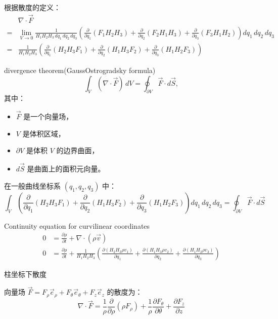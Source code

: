 \documentclass[12pt, a4paper, oneside, UTF8]{ctexbook}  %
\newcommand{\pa}{\partial}
\begin{document}
\begin{defn}
\begin{tui}
根据散度的定义：
\begin{align*}
    &\nabla \cdot \vec{F} 
    \\=& \lim_{V \to 0} \frac{1}{H_1 H_2 H_3 \, dq_1 \, dq_2 \, dq_3} \left( \frac{\partial}{\partial q_1} (F_1 H_2 H_3) 
    + \frac{\partial}{\partial q_2} (F_2 H_1 H_3) + \frac{\partial}{\partial q_3} (F_3 H_1 H_2) \right) dq_1 \, dq_2 \, dq_3
    \\=&\frac{1}{H_1 H_2 H_3} \left( \frac{\partial}{\partial q_1} (H_2 H_3 F_1) + \frac{\partial}{\partial q_2} (H_1 H_3 F_2) 
    + \frac{\partial}{\partial q_3} (H_1 H_2 F_3) \right)
\end{align*}
\end{tui}    
\end{defn}
\begin{lemma}
    divergence theorem(Gauss\textminus Ostrogradsky formula)
\[
\int_V (\nabla \cdot \vec{F}) \, dV = \oint_{\partial V} \vec{F} \cdot d\vec{S},
\]
其中：
\begin{itemize}
    \item \(\vec{F}\) 是一个向量场，
    \item \(V\) 是体积区域，
    \item \(\partial V\) 是体积 \(V\) 的边界曲面，
    \item \(d\vec{S}\) 是曲面上的面积元向量。
\end{itemize}

    在一般曲线坐标系 \((q_1, q_2, q_3)\) 中：
\[
\int_V \left( \frac{\partial}{\partial q_1} (H_2 H_3 F_1) + \frac{\partial}{\partial q_2} (H_1 H_3 F_2) 
+ \frac{\partial}{\partial q_3} (H_1 H_2 F_3) \right) dq_1 \, dq_2 \, dq_3 = \oint_{\partial V} \vec{F} \cdot d\vec{S}
\]
\end{lemma}
\begin{corollary}
    Continuity equation for curvilinear coordinates
    \begin{align*}
        0&=\frac{\pa \rho}{\pa t}+\nabla\cdot\left(\rho\vec{v}\right)\\
        0&=\frac{\pa \rho}{\pa t}+\frac{1}{H_1 H_2 H_3} \left( \frac{\partial(H_2 H_3 \rho v_1)}{\partial q_1}  + \frac{\partial(H_1 H_3 \rho v_2)}{\partial q_2}  
        + \frac{\partial(H_1 H_2 \rho v_3)}{\partial q_3}  \right)
    \end{align*}
\end{corollary}
\begin{example}
    柱坐标下散度

    向量场 \(\vec{F} = F_\rho \vec{e}_\rho + F_\theta \vec{e}_\theta + F_z \vec{e}_z\) 的散度为：
    \[
    \nabla \cdot \vec{F} = \frac{1}{\rho} \frac{\partial}{\partial \rho} (\rho F_\rho) + \frac{1}{\rho} \frac{\partial F_\theta}{\partial \theta} + \frac{\partial F_z}{\partial z}
    \]
\end{example}
\end{document}
